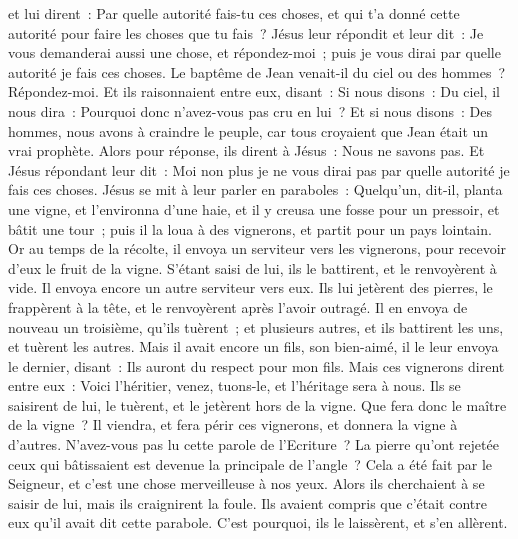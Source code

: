 \begin{multicols}{2}
et lui dirent~: Par quelle autorité fais-tu ces choses, et qui t'a donné cette autorité pour faire les choses que tu fais~?
Jésus leur répondit et leur dit~: Je vous demanderai aussi une chose, et répondez-moi~; puis je vous dirai par quelle autorité je fais ces choses.
Le baptême de Jean venait-il du ciel ou des hommes~? Répondez-moi.
Et ils raisonnaient entre eux, disant~: Si nous disons~: Du ciel, il nous dira~: Pourquoi donc n'avez-vous pas cru en lui~?
Et si nous disons~: Des hommes, nous avons à craindre le peuple, car tous croyaient que Jean était un vrai prophète.
Alors pour réponse, ils dirent à Jésus~: Nous ne savons pas. Et Jésus répondant leur dit~: Moi non plus je ne vous dirai pas par quelle autorité je fais ces choses.
\VerseOne{}Jésus se mit à leur parler en paraboles~: Quelqu'un, dit-il, planta une vigne, et l'environna d'une haie, et il y creusa une fosse pour un pressoir, et bâtit une tour~; puis il la loua à des vignerons, et partit pour un pays lointain.
Or au temps de la récolte, il envoya un serviteur vers les vignerons, pour recevoir d'eux le fruit de la vigne.
S'étant saisi de lui, ils le battirent, et le renvoyèrent à vide.
Il envoya encore un autre serviteur vers eux. Ils lui jetèrent des pierres, le frappèrent à la tête, et le renvoyèrent après l'avoir outragé.
Il en envoya de nouveau un troisième, qu'ils tuèrent~; et plusieurs autres, et ils battirent les uns, et tuèrent les autres.
Mais il avait encore un fils, son bien-aimé, il le leur envoya le dernier, disant~: Ils auront du respect pour mon fils.
Mais ces vignerons dirent entre eux~: Voici l'héritier, venez, tuons-le, et l'héritage sera à nous.
Ils se saisirent de lui, le tuèrent, et le jetèrent hors de la vigne.
Que fera donc le maître de la vigne~? Il viendra, et fera périr ces vignerons, et donnera la vigne à d'autres.
N'avez-vous pas lu cette parole de l'Ecriture~? La pierre qu'ont rejetée ceux qui bâtissaient est devenue la principale de l'angle~?
Cela a été fait par le Seigneur, et c'est une chose merveilleuse à nos yeux.
Alors ils cherchaient à se saisir de lui, mais ils craignirent la foule. Ils avaient compris que c'était contre eux qu'il avait dit cette parabole. C'est pourquoi, ils le laissèrent, et s'en allèrent.

\end{multicols}
